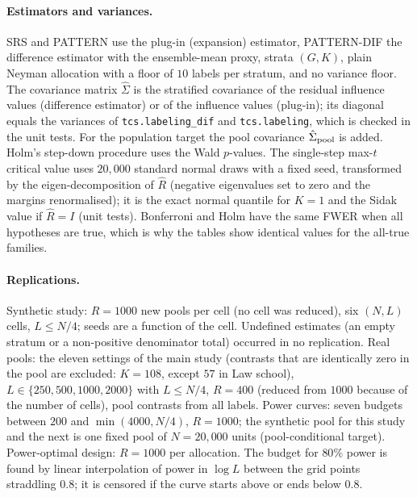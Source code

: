 \documentclass[pdflatex,sn-mathphys-num,iicol]{sn-jnl}
\theoremstyle{thmstyleone}
\theoremstyle{thmstyletwo}
\theoremstyle{thmstylethree}
\begin{document}
\paragraph{Estimators and variances.} SRS and PATTERN use the plug-in (expansion) estimator, PATTERN-DIF the difference estimator with the ensemble-mean proxy, strata $(G,K)$, plain Neyman allocation with a floor of $10$ labels per stratum, and no variance floor. The covariance matrix $\hat\Sigma$ is the stratified covariance of the residual influence values (difference estimator) or of the influence values (plug-in); its diagonal equals the variances of \texttt{tcs.labeling\_dif} and \texttt{tcs.labeling}, which is checked in the unit tests. For the population target the pool covariance $\hat\Sigma_{\rm pool}$ is added. Holm's step-down procedure \citep{holm1979} uses the Wald $p$-values. The single-step max-$t$ critical value uses $20{,}000$ standard normal draws with a fixed seed, transformed by the eigen-decomposition of $\hat R$ (negative eigenvalues set to zero and the margins renormalised); it is the exact normal quantile for $K=1$ and the Sidak value if $\hat R=I$ (unit tests). Bonferroni and Holm have the same FWER when all hypotheses are true, which is why the tables show identical values for the all-true families.

\paragraph{Replications.} Synthetic study: $R=1000$ new pools per cell (no cell was reduced), six $(N,L)$ cells, $L\le N/4$; seeds are a function of the cell. Undefined estimates (an empty stratum or a non-positive denominator total) occurred in no replication. Real pools: the eleven settings of the main study (contrasts that are identically zero in the pool are excluded: $K=108$, except $57$ in Law school), $L\in\{250,500,1000,2000\}$ with $L\le N/4$, $R=400$ (reduced from $1000$ because of the number of cells), pool contrasts from all labels. Power curves: seven budgets between $200$ and $\min(4000,N/4)$, $R=1000$; the synthetic pool for this study and the next is one fixed pool of $N=20{,}000$ units (pool-conditional target). Power-optimal design: $R=1000$ per allocation. The budget for $80\%$ power is found by linear interpolation of power in $\log L$ between the grid points straddling $0.8$; it is censored if the curve starts above or ends below $0.8$.
\end{document}
